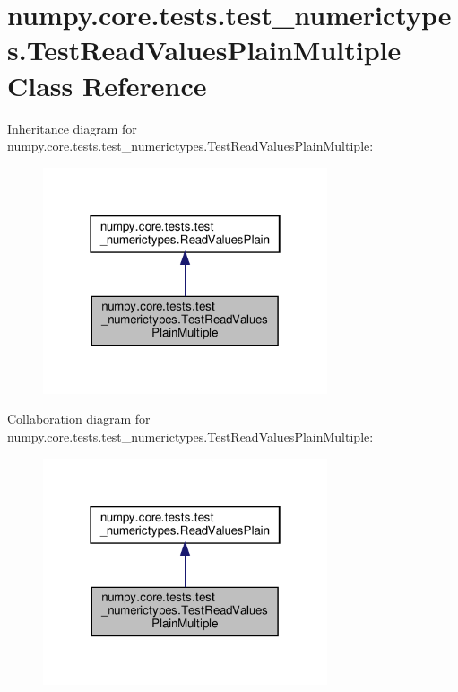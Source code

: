 \hypertarget{classnumpy_1_1core_1_1tests_1_1test__numerictypes_1_1TestReadValuesPlainMultiple}{}\section{numpy.\+core.\+tests.\+test\+\_\+numerictypes.\+Test\+Read\+Values\+Plain\+Multiple Class Reference}
\label{classnumpy_1_1core_1_1tests_1_1test__numerictypes_1_1TestReadValuesPlainMultiple}


Inheritance diagram for numpy.\+core.\+tests.\+test\+\_\+numerictypes.\+Test\+Read\+Values\+Plain\+Multiple\+:
\nopagebreak
\begin{figure}[H]
\begin{center}
\leavevmode
\includegraphics[width=238pt]{classnumpy_1_1core_1_1tests_1_1test__numerictypes_1_1TestReadValuesPlainMultiple__inherit__graph}
\end{center}
\end{figure}


Collaboration diagram for numpy.\+core.\+tests.\+test\+\_\+numerictypes.\+Test\+Read\+Values\+Plain\+Multiple\+:
\nopagebreak
\begin{figure}[H]
\begin{center}
\leavevmode
\includegraphics[width=238pt]{classnumpy_1_1core_1_1tests_1_1test__numerictypes_1_1TestReadValuesPlainMultiple__coll__graph}
\end{center}
\end{figure}
